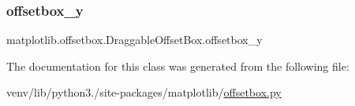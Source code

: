\mbox{\label{classmatplotlib_1_1offsetbox_1_1DraggableOffsetBox_ae475d38728bed8a0f11a7c82df82c048}} 
\subsubsection{\texorpdfstring{offsetbox\+\_\+y}{offsetbox\_y}}
{\footnotesize\ttfamily matplotlib.\+offsetbox.\+Draggable\+Offset\+Box.\+offsetbox\+\_\+y}



The documentation for this class was generated from the following file\+:\begin{DoxyCompactItemize}
\item 
venv/lib/python3./site-\/packages/matplotlib/\hyperlink{offsetbox_8py}{offsetbox.\+py}\end{DoxyCompactItemize}

